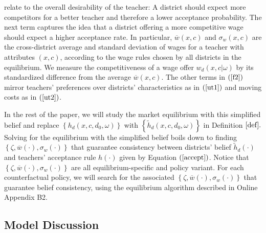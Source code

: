 \documentclass[notitlepage,12pt]{article}%
\begin{document}
relate to the overall desirability of the teacher: A district should expect
more competitors for a better teacher and therefore a lower acceptance
probability. The next term captures the idea that a district offering a more
competitive wage should expect a higher acceptance rate. In particular,
$\overline{w}\left(  x,c\right)  $ and $\sigma_w\left(  x,c\right)  $ are the
cross-district average and standard deviation of wages for a teacher with
attributes $\left(  x,c\right)  $, according to the wage rules chosen by all
districts in the equilibrium. We measure the competitiveness of a wage offer
$w_d\left(  x,c|\omega\right)  $ by its standardized difference from the
average $\overline{w}\left(  x,c\right)  $. The other terms in $\left(
\ref{f2}\right)  $ mirror teachers' preferences over districts'
characteristics as in $\left(  \ref{ut1}\right)  $ and moving costs as in
$\left(  \ref{ut2}\right)  $.

In the rest of the paper, we will study the market equilibrium with this
simplified belief and replace $\left\{  h_{d}\left(  x,c,d_{0},\omega\right)
\right\}  $ with $\left\{  \widetilde{h}_{d}\left(  x,c,d_{0},\omega\right)
\right\}  $ in Definition $\ref{def}.$ Solving for the equilibrium with the
simplified belief boils down to finding $\left\{  \zeta,\overline{w}\left(
\cdot\right)  ,\sigma_{w}\left(  \cdot\right)  \right\}  $ that guarantee
consistency between districts' belief $\widetilde{h}_{d}\left(  \cdot\right)
$ and teachers' acceptance rule $h\left(  \cdot\right)  $ given by Equation
$\left(  \ref{accept}\right)  $. Notice that $\left\{  \zeta,\overline
{w}\left(  \cdot\right)  ,\sigma_{w}\left(  \cdot\right)  \right\}  $ are all
equilibrium-specific and\emph{ }policy variant. For each counterfactual
policy, we will search for the associated $\left\{  \zeta,\overline{w}\left(
\cdot\right)  ,\sigma_{w}\left(  \cdot\right)  \right\}  $ that guarantee
belief consistency, using the equilibrium algorithm described in Online
Appendix B2.

\subsection{Model Discussion\label{discuss}}
\end{document}
